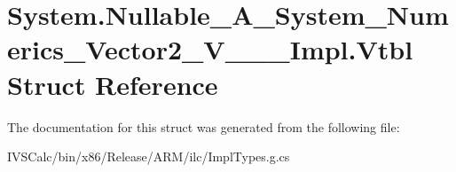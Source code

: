 \hypertarget{struct_system_1_1_nullable___a___system___numerics___vector2___v_______impl_1_1_vtbl}{}\section{System.\+Nullable\+\_\+\+A\+\_\+\+System\+\_\+\+Numerics\+\_\+\+Vector2\+\_\+\+V\+\_\+\+\_\+\+\_\+\+Impl.\+Vtbl Struct Reference}
\label{struct_system_1_1_nullable___a___system___numerics___vector2___v_______impl_1_1_vtbl}


The documentation for this struct was generated from the following file\+:\begin{DoxyCompactItemize}
\item 
I\+V\+S\+Calc/bin/x86/\+Release/\+A\+R\+M/ilc/Impl\+Types.\+g.\+cs\end{DoxyCompactItemize}
